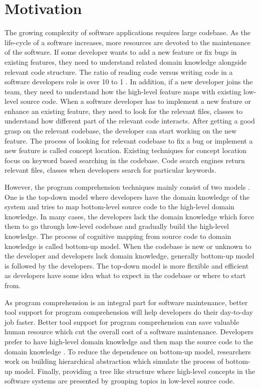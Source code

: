 \section{Motivation}
 The growing complexity of software applications requires large codebase. As the life-cycle of a software increases, more resources are devoted to the maintenance of the software. If some developer wants to add a new feature or fix bugs in existing features, they need to understand related domain knowledge alongside relevant code structure. The ratio of reading code versus writing code in a software developers role is over 10 to 1 \cite{martin2008clean}. In addition, if a new developer joins the team, they need to understand how the high-level feature maps with existing low-level source code. When a software developer has to implement a new feature or enhance an existing feature, they need to look for the relevant files, classes to understand how different part of the relevant code interacts. After getting a good grasp on the relevant codebase, the developer can start working on the new feature. The process of looking for relevant codebase to fix a bug or implement a new feature is called concept location. Existing techniques for concept location focus on keyword based searching in the codebase. Code search engines return relevant files, classes when developers search for particular keywords. 
 
 However, the program comprehension techniques mainly consist of two models \cite{tilley1998reverseEngineeringFramework, von1993programToolRequirements, siegmund2016programPastFuture}. One is the top-down model where developers have the domain knowledge of the system and tries to map bottom-level source code to the high-level domain knowledge. In many cases, the developers lack the domain knowledge which force them to go through low-level codebase and gradually build the high-level knowledge. The process of cognitive mapping from source code to domain knowledge is called bottom-up model. When the codebase is new or unknown to the developer and developers lack domain knowledge, generally bottom-up model is followed by the developers. The top-down model is more flexible and efficient as developers have some idea what to expect in the codebase or where to start from. 
 
 As program comprehension is an integral part for software maintenance, better tool support for program comprehension will help developers do their day-to-day job faster. Better tool support for program comprehension can save valuable human resource which cut the overall cost of a software maintenance. Developers prefer to have high-level domain knowledge and then map the source code to the domain knowledge \cite{brooks1983theoryComprehensionPrograms}. To reduce the dependence on bottom-up model, researchers work on building hierarchical abstraction which simulate the process of bottom-up model. Finally, providing a tree like structure where high-level concepts in the software systems are presented by grouping topics in low-level source code. 
\newpage

